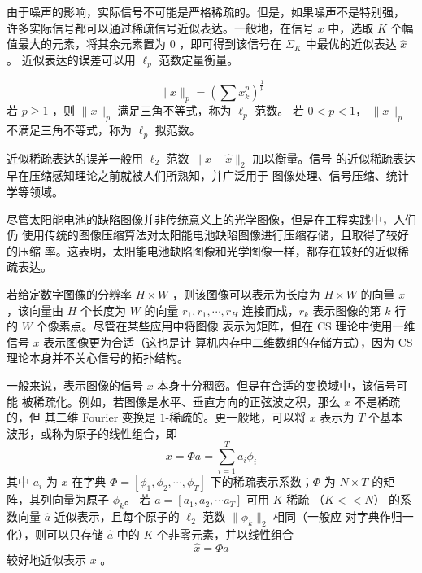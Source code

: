 由于噪声的影响，实际信号不可能是严格稀疏的。但是，如果噪声不是特别强，
许多实际信号都可以通过稀疏信号近似表达。一般地，在信号 $x$ 中，选取
$K$ 个幅值最大的元素，将其余元素置为 $0$ ，即可得到该信号在 $\Sigma_K$
中最优的近似表达 $\hat x$\cite{KeepK}。 近似表达的误差可以用 $\ell_p$
范数定量衡量。
\begin{definition} \label{def:lp}
\begin{equation}
\|x\|_p = \left( \sum x_k^p \right)^{\frac{1}{p}}
\end{equation}
若 $p \geq 1$ ，则 $\|x\|_p$ 满足三角不等式，称为 $\ell_p$ 范数。
若 $0 < p < 1$， $\|x\|_p$ 不满足三角不等式，称为 $\ell_p$ 拟范数。
\end{definition}

近似稀疏表达的误差一般用 $\ell_2$ 范数 $\|x - \hat x\|_2$ 加以衡量。信号
的近似稀疏表达早在压缩感知理论之前就被人们所熟知，并广泛用于
图像处理\cite{SparseImage}、信号压缩、统计学\cite{lasso}等领域。

尽管太阳能电池的缺陷图像并非传统意义上的光学图像，但是在工程实践中，人们仍
使用传统的图像压缩算法对太阳能电池缺陷图像进行压缩存储，且取得了较好的压缩
率。这表明，太阳能电池缺陷图像和光学图像一样，都存在较好的近似稀疏表达。

若给定数字图像的分辨率 $H \times W$ ，则该图像可以表示为长度为 $H \times W$
的向量 $x$ ，该向量由 $H$ 个长度为 $W$ 的向量 $r_1, r_1, \cdots, r_H$
连接而成，$r_k$ 表示图像的第 $k$ 行的 $W$ 个像素点。尽管在某些应用中将图像
表示为矩阵，但在 CS 理论中使用一维信号 $x$ 表示图像更为合适（这也是计
算机内存中二维数组的存储方式），因为 CS 理论本身并不关心信号的拓扑结构。

一般来说，表示图像的信号 $x$ 本身十分稠密。但是在合适的变换域中，该信号可能
被稀疏化。例如，若图像是水平、垂直方向的正弦波之积，那么 $x$ 不是稀疏的，但
其二维 Fourier 变换是 $1$-稀疏的。更一般地，可以将 $x$ 表示为 $T$ 个基本
波形，或称为原子的线性组合，即
\begin{equation}
x = \Phi a = \sum_{i=1}^T a_i \phi_i
\end{equation}
其中 $a_i$ 为 $x$ 在字典 $\Phi = [\phi_1, \phi_2, \cdots, \phi_T]$
下的稀疏表示系数；$\Phi$ 为 $N \times T$ 的矩阵，其列向量为原子 $\phi_k$。
若 $a = [a_1, a_2, \cdots a_T]$ 可用 $K$-稀疏 （$K << N$） 的系数向量
$\hat a$ 近似表示，且每个原子的 $\ell_2$ 范数 $\|\phi_k\|_2$ 相同（一般应
对字典作归一化），则可以只存储 $\hat a$ 中的 $K$ 个非零元素，并以线性组合
\begin{equation}
\hat x = \Phi \hat a
\end{equation}
较好地近似表示 $x$ 。

